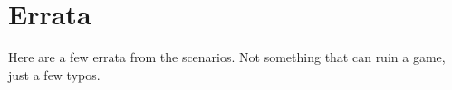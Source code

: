 \documentclass[a4paper,twocolumn]{article}
\begin{document}
\vspace{1mm}


\section*{Errata}

Here are a few errata from the scenarios. Not something that can ruin a game, just
a few typos.

\vspace{1mm}


\end{document}
